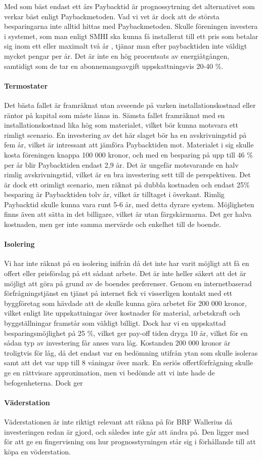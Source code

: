Med som bäst endast ett års Paybacktid är prognossytrning det alternativet som verkar bäst enligt Paybackmetoden. Vad vi vet är dock att de största besparingarna inte alltid hittas med Paybackmetoden. Skulle föreningen investera i systemet, som man enligt SMHI ska kunna få installerat till ett pris som betalar sig inom ett eller maximalt två år \cite{smhi1} \cite{smhi2}, tjänar man efter paybacktiden inte väldigt mycket pengar per år. Det är inte en hög procentsats av energiåtgången, samtidigt som de tar en abonnemangsavgift uppskattningsvis 20-40 \%. \cite{smhi1} \cite{smhi2}

\paragraph{Termostater}
Det bästa fallet är framräknat utan avseende på varken installationskostnad eller räntor på kapital som måste lånas in. Sämsta fallet framräknat med en installationskostnad lika hög som materialet, vilket bör kunna motsvara ett rimligt scenario. En investering av det här slaget bör ha en avskrivningstid på fem år, vilket är intressant att jämföra Paybacktiden mot. Materialet i sig skulle kosta föreningen knappa 100 000 kronor, och med en besparing på upp till 46 \% \cite{danfoss} per år blir Paybacktiden endast 2,9 år. Det är ungefär motsvarande en halv rimlig avskrivningstid, vilket är en bra investering sett till de perspektiven. Det är dock ett orimligt scenario, men räknat på dubbla kostnaden och endast 25\% besparing är Paybacktiden tolv år, vilket är tilltaget i överkant. Rimlig Paybacktid skulle kunna vara runt 5-6 år, med detta dyrare system. Möjligheten finns även att sätta in det billigare, vilket är utan färgskärmarna. Det ger halva kostnaden, men ger inte samma mervärde och enkelhet till de boende.

\paragraph{Isolering}
Vi har inte räknat på en isolering inifrån då det inte har varit möjligt att få en offert eller prisförslag på ett sådant arbete. Det är inte heller säkert att det är möjligt att göra på grund av de boendes preferenser. Genom en internetbaserad förfrågningstjänst en tjänst på internet fick vi visserligen kontakt med ett byggföretag som hävdade att de skulle kunna göra arbetet för 200 000 kronor, vilket enligt lite uppskattningar över kostnader för material, arbetskraft och byggställningar framstår som väldigt billigt. Dock har vi en uppskattad besparingsmöjlighet på 25 \%, vilket ger pay-off tiden dryga 10 år, vilket för en sådan typ av investering får anses vara låg. Kostanden 200 000 kronor är troligtvis för låg, då det endast var en bedömning utifrån ytan som skulle isoleras samt att det var upp till 8 våningar över mark. En seriös offertförfrågning skulle ge en rättvisare approximation, men vi bedömde att vi inte hade de befogenheterna. Dock ger 

\paragraph{Väderstation}
Väderstationen är inte riktigt relevant att räkna på för BRF Wallerius då investeringen redan är gjord, och således inte går att ändra på. Den ligger med för att ge en fingervisning om hur prognosstyrningen står sig i förhållande till att köpa en vöderstation.
